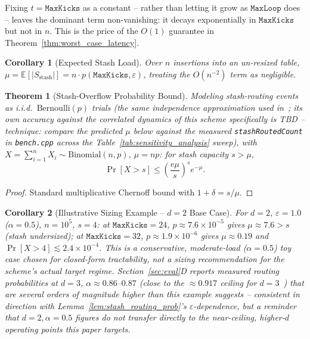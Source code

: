 \documentclass[conference]{IEEEtran}
\newtheorem{theorem}{Theorem}
\newtheorem{corollary}{Corollary}
\begin{document}
	Fixing $t=\mathtt{MaxKicks}$ as a constant -- rather than letting it
	grow as $\mathtt{MaxLoop}$ does -- leaves the dominant term
	non-vanishing: it decays exponentially in $\mathtt{MaxKicks}$ but not
	in $n$. This is the price of the $O(1)$ guarantee in
	Theorem~\ref{thm:worst_case_latency}.
	
	\begin{corollary}[Expected Stash Load]
		\label{cor:expected_stash_load}
		Over $n$ insertions into an un-resized table,
		$\mu = \mathbb{E}[|S_{\text{stash}}|] = n\cdot p(\mathtt{MaxKicks},\varepsilon)$,
		treating the $O(n^{-2})$ term as negligible.
	\end{corollary}
	
	\begin{theorem}[Stash-Overflow Probability Bound]
		\label{thm:stash_overflow_bound}
		Modeling stash-routing events as i.i.d.\ $\text{Bernoulli}(p)$
		trials (the same independence approximation used
		in~\cite{kirsch2009stash,xiong2025tecache}; its own accuracy against
		the correlated dynamics of this scheme specifically is TBD --
		\emph{technique}: compare the predicted $\mu$ below against the
		measured \texttt{stashRoutedCount} in \texttt{bench.cpp} across the
		Table~\ref{tab:sensitivity_analysis} sweep), with
		$X=\sum_{i=1}^n X_i \sim \text{Binomial}(n,p)$, $\mu=np$: for stash
		capacity $s>\mu$,
		\begin{equation}
			\Pr[X>s] \le \left(\frac{e\mu}{s}\right)^s e^{-\mu}.
		\end{equation}
	\end{theorem}
	\begin{proof}
		Standard multiplicative Chernoff bound with $1+\delta=s/\mu$.
	\end{proof}
	
	\begin{corollary}[Illustrative Sizing Example -- $d=2$ Base Case]
		\label{cor:worked_example}
		For $d=2$, $\varepsilon=1.0$ ($\alpha=0.5$), $n=10^5$, $s=4$:
		at $\mathtt{MaxKicks}=24$, $p\approx 7.6\times10^{-5}$ gives
		$\mu\approx 7.6 > s$ (stash undersized); at $\mathtt{MaxKicks}=32$,
		$p\approx 1.9\times10^{-6}$ gives $\mu\approx 0.19$ and
		$\Pr[X>4]\lesssim 2.4\times10^{-4}$. This is a conservative,
		moderate-load ($\alpha=0.5$) toy case chosen for closed-form
		tractability, \emph{not} a sizing recommendation for the scheme's
		actual target regime. Section~\ref{sec:eval}D reports measured
		routing probabilities at $d=3$, $\alpha\approx0.86$--$0.87$ (close
		to the $\approx 0.917$ ceiling for $d=3$~\cite{fountoulakis2012sharp})
		that are several orders of magnitude higher than this example
		suggests -- consistent in direction with
		Lemma~\ref{lem:stash_routing_prob}'s $\varepsilon$-dependence, but a
		reminder that $d=2,\alpha=0.5$ figures do not transfer directly to
		the near-ceiling, higher-$d$ operating points this paper targets.
	\end{corollary}
	
\end{document}
